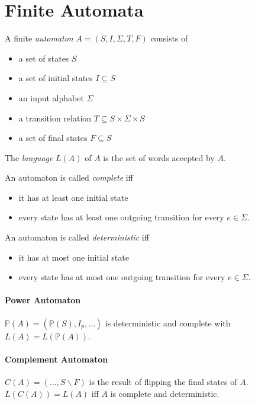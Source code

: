 \documentclass{article}
\begin{document}


\section*{Finite Automata}

A finite \emph{automaton} $A = (S, I, \Sigma, T, F)$ consists of
\begin{itemize}
    \item a set of states $S$
    \item a set of initial states $I \subseteq S$
    \item an input alphabet $\Sigma$
    \item a transition relation $T \subseteq S \times \Sigma \times S$
    \item a set of final states $F \subseteq S$
\end{itemize}

The \emph{language} $L(A)$ of $A$ is the set of words accepted by $A$.

An automaton is called \emph{complete} iff
\begin{itemize}
    \item it has at least one initial state
    \item every state has at least one outgoing transition for every $e \in \Sigma$.
\end{itemize}

An automaton is called \emph{deterministic} iff
\begin{itemize}
    \item it has at most one initial state
    \item every state has at most one outgoing transition for every $e \in \Sigma$.
\end{itemize}

\paragraph{Power Automaton} $\mathbb{P}(A) = (\mathbb{P}(S), I_p, \ldots)$ is deterministic and complete with $L(A) = L(\mathbb{P}(A))$.

\paragraph{Complement Automaton} $C(A) = (\ldots, S \backslash F)$ is the result of flipping the final states of $A$. $L(C(A)) = \overline{L(A)}$ iff $A$ is complete and deterministic.
\end{document}
